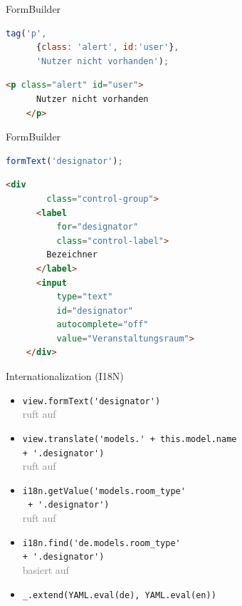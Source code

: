 \begin{frame}[fragile]{FormBuilder}
  \begin{lstlisting}[language=JavaScript,gobble=4]
    tag('p',
      {class: 'alert', id:'user'},
      'Nutzer nicht vorhanden');
  \end{lstlisting}
  \begin{lstlisting}[language=HTML,gobble=4]
    <p class="alert" id="user">
      Nutzer nicht vorhanden
    </p>
  \end{lstlisting}
\end{frame}

\begin{frame}[fragile]{FormBuilder}
  \begin{lstlisting}[language=JavaScript,gobble=4]
    formText('designator');
  \end{lstlisting}
  \begin{lstlisting}[language=HTML,gobble=4]
    <div
        class="control-group">
      <label
          for="designator"
          class="control-label">
        Bezeichner
      </label>
      <input
          type="text"
          id="designator"
          autocomplete="off"
          value="Veranstaltungsraum">
    </div>
  \end{lstlisting}
\end{frame}

\begin{frame}{Internationalization (I18N)}
  \begin{itemize}
    \item \lstinline[lang=JavaScript]-view.formText('designator')-\\
      \hfill\textcolor{gray}{ruft auf}\hfill\strut
    \item \lstinline[lang=JavaScript]-view.translate('models.' + this.model.name-\\
      \qquad  \lstinline[lang=JavaScript]-+ '.designator')-\\
      \hfill\textcolor{gray}{ruft auf}\hfill\strut
    \item \lstinline[lang=JavaScript]-i18n.getValue('models.room_type'-\\
      \qquad \lstinline[lang=JavaScript]- + '.designator')-\\
      \hfill\textcolor{gray}{ruft auf}\hfill\strut
    \item \lstinline[lang=JavaScript]-i18n.find('de.models.room_type'- \\
      \qquad \lstinline[lang=JavaScript]-+ '.designator')-\\
      \hfill\textcolor{gray}{basiert auf}\hfill\strut
    \item \lstinline[lang=JavaScript]-_.extend(YAML.eval(de), YAML.eval(en))-
  \end{itemize}
\end{frame}

